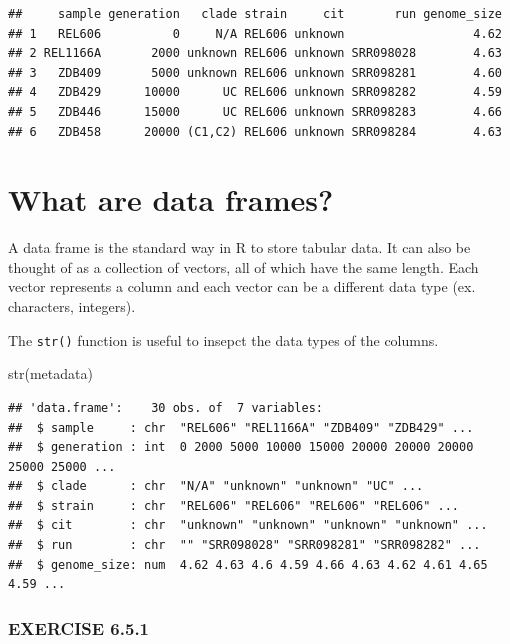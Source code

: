 \documentclass[
]{book}
\newenvironment{Shaded}{\begin{snugshade}}{\end{snugshade}}
\newcommand{\FunctionTok}[1]{\textcolor[rgb]{0.00,0.00,0.00}{#1}}
\newcommand{\NormalTok}[1]{#1}
\begin{document}
\begin{verbatim}
##     sample generation   clade strain     cit       run genome_size
## 1   REL606          0     N/A REL606 unknown                  4.62
## 2 REL1166A       2000 unknown REL606 unknown SRR098028        4.63
## 3   ZDB409       5000 unknown REL606 unknown SRR098281        4.60
## 4   ZDB429      10000      UC REL606 unknown SRR098282        4.59
## 5   ZDB446      15000      UC REL606 unknown SRR098283        4.66
## 6   ZDB458      20000 (C1,C2) REL606 unknown SRR098284        4.63
\end{verbatim}

\hypertarget{what-are-data-frames}{%
\section{What are data frames?}\label{what-are-data-frames}}

A data frame is the standard way in R to store tabular data. It can also be thought of as a collection of vectors, all of which have the same length. Each vector represents a column and each vector can be a different data type (ex. characters, integers).

The \texttt{str()} function is useful to insepct the data types of the columns.

\begin{Shaded}
\begin{Highlighting}[]
\FunctionTok{str}\NormalTok{(metadata)}
\end{Highlighting}
\end{Shaded}

\begin{verbatim}
## 'data.frame':    30 obs. of  7 variables:
##  $ sample     : chr  "REL606" "REL1166A" "ZDB409" "ZDB429" ...
##  $ generation : int  0 2000 5000 10000 15000 20000 20000 20000 25000 25000 ...
##  $ clade      : chr  "N/A" "unknown" "unknown" "UC" ...
##  $ strain     : chr  "REL606" "REL606" "REL606" "REL606" ...
##  $ cit        : chr  "unknown" "unknown" "unknown" "unknown" ...
##  $ run        : chr  "" "SRR098028" "SRR098281" "SRR098282" ...
##  $ genome_size: num  4.62 4.63 4.6 4.59 4.66 4.63 4.62 4.61 4.65 4.59 ...
\end{verbatim}

\hypertarget{exercise-6.5.1}{%
\subsubsection*{EXERCISE 6.5.1}\label{exercise-6.5.1}}
\end{document}
